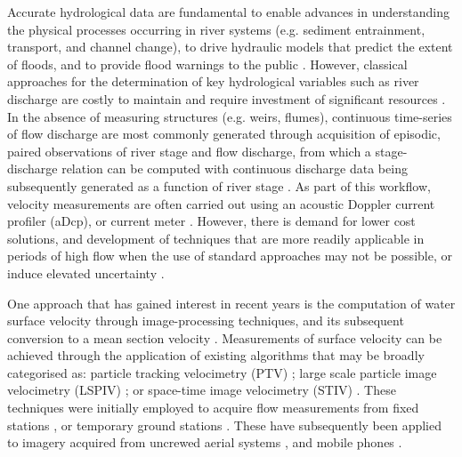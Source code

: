 \documentclass[hess, manuscript]{copernicus} %
\begin{document}
Accurate hydrological data are fundamental to enable advances in understanding the physical processes occurring in river systems (e.g. sediment entrainment, transport, and channel change), to drive hydraulic models that predict the extent of floods, and to provide flood warnings to the public \citep{McMillan2017,Tauro2018}. However, classical approaches for the determination of key hydrological variables such as river discharge are costly to maintain and require investment of significant resources \citep{Fekete2007}. In the absence of measuring structures (e.g. weirs, flumes), continuous time-series of flow discharge are most commonly generated through acquisition of episodic, paired observations of river stage and flow discharge, from which a stage-discharge relation can be computed with continuous discharge data being subsequently generated as a function of river stage \citep{Kiang2018}. As part of this workflow, velocity measurements are often carried out using an acoustic Doppler current profiler (aDcp), or current meter \citep{Herschy2014}. However, there is demand for lower cost solutions, and development of techniques that are more readily applicable in periods of high flow when the use of standard approaches may not be possible, or induce elevated uncertainty \citep{Kidson2005, Baldassarre2009}. 

One approach that has gained interest in recent years is the computation of water surface velocity through image-processing techniques, and its subsequent conversion to a mean section velocity \citep{Jolley2021}. Measurements of surface velocity can be achieved through the application of existing algorithms that may be broadly categorised as: particle tracking velocimetry (PTV) \citep{Brevis2011,Tauro2017b}; large scale particle image velocimetry (LSPIV) \citep{Fujita1998, Muste2008}; or space-time image velocimetry (STIV) \citep{Fujita2007}. These techniques were initially employed to acquire flow measurements from fixed stations \citep{Bradley2002,Hauet2008,Stumpf2016}, or temporary ground stations \citep{Jodeau2008, Kim2008, Dramais2011}. These have subsequently been applied to imagery acquired from uncrewed aerial systems \citep[e.g., ][]{Lewis2018, Masafu2022}, and mobile phones \citep[e.g., DischargeApp; ][]{Haro2021}. 
\end{document}
